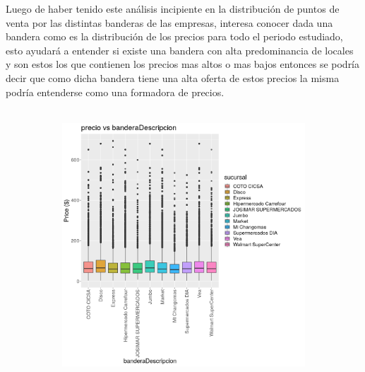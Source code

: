 Luego de haber tenido este análisis incipiente en la distribución de puntos de venta por las distintas banderas de las empresas, interesa conocer dada una bandera como es la distribución de los precios para todo el periodo estudiado, esto ayudará a entender si existe una bandera con alta predominancia de locales y son estos los que contienen los precios mas altos o mas bajos entonces se podría decir que como dicha bandera tiene una alta oferta de estos precios la misma podría entenderse como una formadora de precios.\\
\\



\begin{figure}[h]
\centering
\begin{subfigure}{.5\textwidth}
  \centering
  \includegraphics[width=0.4\paperwidth, height=0.4\paperheight, keepaspectratio]{img/precio_vs_bandera.png}
\end{subfigure}%
\begin{subfigure}{.5\textwidth}
  \centering

\end{subfigure}
\end{figure}

